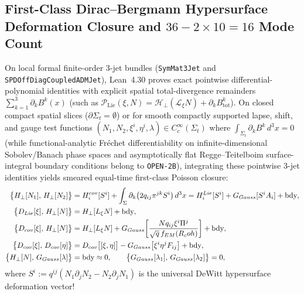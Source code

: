 \subsection{First-Class Dirac--Bergmann Hypersurface Deformation Closure and $36 - 2\times 10 = 16$ Mode Count}

On local formal finite-order 3-jet bundles (\texttt{SymMat3Jet} and \texttt{SPDOff\allowbreak{}Diag\allowbreak{}Coupled\allowbreak{}ADMJet}), Lean~4.30 proves exact pointwise differential-polynomial identities with explicit spatial total-divergence remainders $\sum_{k=1}^3\partial_k B^k(x)$ (such as $\mathcal{P}_{\mathrm{Lie}}(\xi, N) = \mathcal{H}_\perp(\mathcal{L}_\xi N) + \partial_k B_{\mathrm{tot}}^k$). On closed compact spatial slices ($\partial\Sigma_t = \emptyset$) or for smooth compactly supported lapse, shift, and gauge test functions $(N_1, N_2, \xi^i, \eta^i, \lambda) \in C_c^\infty(\Sigma_t)$ where $\int_{\Sigma_t}\partial_k B^k\,d^3x = 0$ (while functional-analytic Fr\'echet differentiability on infinite-dimensional Sobolev/Banach phase spaces and asymptotically flat Regge--Teitelboim surface-integral boundary conditions belong to \texttt{OPEN-2B}), integrating these pointwise 3-jet identities yields smeared equal-time first-class Poisson closure:
\begin{align}
\bigl\{H_\perp[N_1],\,H_\perp[N_2]\bigr\}
&= H_i^{cov}[S^i] + \int_{\Sigma} \partial_k\bigl(2 q_{ij}\pi^{jk} S^i\bigr)\,d^3x
= H_i^{Lie}[S^i] + G_{Gauss}[S^i A_i] + \text{bdy}, \label{eq:pb_H_H}\\
\bigl\{D_{Lie}[\xi],\,H_\perp[N]\bigr\}
&= H_\perp[L_\xi N] + \text{bdy}, \label{eq:pb_DLie_H}\\
\bigl\{D_{cov}[\xi],\,H_\perp[N]\bigr\}
&= H_\perp[L_\xi N] + G_{Gauss}\!\left[\frac{N q_{ij}\xi^i\Pi^j}{\sqrt{q}\,f_{EM}(R_coh)}\right] + \text{bdy}, \label{eq:pb_Dcov_H}\\
\bigl\{D_{cov}[\xi],\,D_{cov}[\eta]\bigr\}
&= D_{cov}\bigl[[\xi,\eta]\bigr] - G_{Gauss}\bigl[\xi^i\eta^j F_{ij}\bigr] + \text{bdy}, \label{eq:pb_Dcov_Dcov}\\
\bigl\{H_\perp[N],\,G_{Gauss}[\lambda]\bigr\} &= \text{bdy} \approx 0,
\qquad
\bigl\{G_{Gauss}[\lambda_1],\,G_{Gauss}[\lambda_2]\bigr\} = 0, \label{eq:pb_H_G}
\end{align}
where $S^i := q^{ij}(N_1\partial_j N_2 - N_2\partial_j N_1)$ is the universal DeWitt hypersurface deformation vector!


